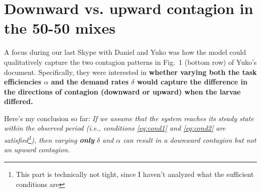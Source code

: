 \documentclass[10pt]{article}
\theoremstyle{remark}
\begin{document}
\newpage
\section{Downward vs. upward contagion in the 50-50 mixes} \label{sec:contagion}

A focus during our last Skype with Daniel and Yuko was how the model could qualitatively capture the two contagion patterns in Fig.~1 (bottom row) of Yuko's document. Specifically, they were interested in \textbf{whether varying both the task efficiencies $\alpha$ and the demand rates $\delta$ would capture the difference in the directions of contagion (downward or upward) when the larvae differed.}

Here's my conclusion so far: {\color{red}\textit{If we assume that the system reaches its steady state within the observed period (i.e., conditions \eqref{eq:cond1} and \eqref{eq:cond2} are satisfied\footnote{This part is technically not tight, since I haven't analyzed what the sufficient conditions are}), then varying \textbf{only} $\delta$ and $\alpha$ can result in a downward contagion but not an upward contagion.}}
\end{document}

